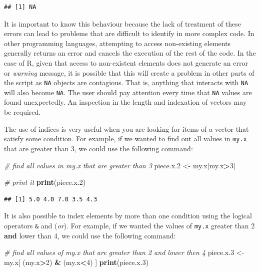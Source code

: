 \documentclass[11pt,]{book}
\newenvironment{Shaded}{\begin{snugshade}}{\end{snugshade}}
\newcommand{\KeywordTok}[1]{\textcolor[rgb]{0.27,0.27,0.27}{\textbf{#1}}}
\newcommand{\DecValTok}[1]{\textcolor[rgb]{0.06,0.06,0.06}{#1}}
\newcommand{\StringTok}[1]{\textcolor[rgb]{0.5,0.5,0.5}{#1}}
\newcommand{\CommentTok}[1]{\textcolor[rgb]{0.56,0.35,0.01}{\textit{#1}}}
\newcommand{\OperatorTok}[1]{\textcolor[rgb]{0.81,0.36,0.00}{\textbf{#1}}}
\newcommand{\NormalTok}[1]{#1}
\begin{document}
\begin{verbatim}
## [1] NA
\end{verbatim}

It is important to know this behaviour because the lack of treatment of
these errors can lead to problems that are difficult to identify in more
complex code. In other programming languages, attempting to access
non-existing elements generally returns an error and cancels the
execution of the rest of the code. In the case of R, given that access
to non-existent elements does not generate an error or \emph{warning}
message, it is possible that this will create a problem in other parts
of the script as \texttt{NA} objects are contagious. That is, anything
that interacts with \texttt{NA} will also become \texttt{NA}. The user
should pay attention every time that \texttt{NA} values are found
unexpectedly. An inspection in the length and indexation of vectors may
be required.

The use of indices is very useful when you are looking for items of a
vector that satisfy some condition. For example, if we wanted to find
out all values in \texttt{my.x} that are greater than 3, we could use
the following command:

\begin{Shaded}
\begin{Highlighting}[]
\CommentTok{# find all values in my.x that are greater than 3}
\NormalTok{piece.x.}\DecValTok{2}\NormalTok{ <-}\StringTok{ }\NormalTok{my.x[my.x}\OperatorTok{>}\DecValTok{3}\NormalTok{]}

\CommentTok{# print it}
\KeywordTok{print}\NormalTok{(piece.x.}\DecValTok{2}\NormalTok{) }
\end{Highlighting}
\end{Shaded}

\begin{verbatim}
## [1] 5.0 4.0 7.0 3.5 4.3
\end{verbatim}

It is also possible to index elements by more than one condition using
the logical operators \texttt{\&} and \texttt{\textbar{}} (\emph{or}).
For example, if we wanted the values of \texttt{my.x} greater than 2
\textbf{and} lower than 4, we could use the following command:

\begin{Shaded}
\begin{Highlighting}[]
\CommentTok{# find all values of my.x that are greater than 2 and lower then 4}
\NormalTok{piece.x.}\DecValTok{3}\NormalTok{ <-}\StringTok{ }\NormalTok{my.x[ (my.x}\OperatorTok{>}\DecValTok{2}\NormalTok{) }\OperatorTok{&}\StringTok{ }\NormalTok{(my.x}\OperatorTok{<}\DecValTok{4}\NormalTok{) ]}
\KeywordTok{print}\NormalTok{(piece.x.}\DecValTok{3}\NormalTok{)}
\end{Highlighting}
\end{Shaded}
\end{document}
